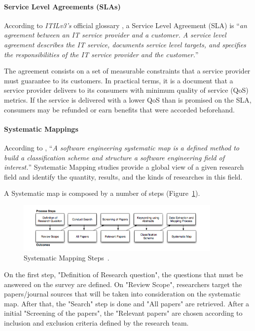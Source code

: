 \documentclass{article}
\begin{document}
\paragraph*{Service Level Agreements (SLAs)}
According to \textit{ITILv3's} official glossary \cite{itilv3glossary}, a Service Level Agreement (SLA) is ``\textit{an agreement between an IT service provider and a customer. 
A service level agreement describes the IT service, documents service level targets, and specifies the responsibilities of the IT service provider and the customer.}'' 

The agreement consists on a set of measurable constraints that a service provider must guarantee to its customers.
In practical terms, it is a document that a service provider delivers to its consumers with minimum quality of service (QoS) metrics. 
If the service is delivered with a lower QoS than is promised on the SLA, consumers may be refunded or earn benefits that were accorded beforehand.    

\paragraph*{Systematic Mappings}
According to \cite{Petersen:2008:SMS:2227115.2227123}, ``\textit{A software engineering systematic map is a defined method to build a classification scheme and structure a software engineering field of interest.}''
Systematic Mapping studies provide a global view of a given research field and identify the quantity, results, and the kinds of researches in this field.

A Systematic map is composed by a number of steps (Figure~\ref{fig:sms}).
\begin{figure}[ht!]
\centering
\includegraphics[width=100mm]{pic1.png}
\caption{Systematic Mapping Steps~\cite{Petersen:2008:SMS:2227115.2227123}.\label{fig:sms}}
\end{figure}

On the first step, "Definition of Research question", the questions that must be answered on the survey are defined. On "Review Scope", researchers target the papers/journal sources that will be taken into consideration on the systematic map. After that, the "Search" step is done and "All papers" are retrieved. After a initial "Screening of the papers", the "Relevant papers" are chosen according to inclusion and exclusion criteria defined by the research team. 
\end{document}
